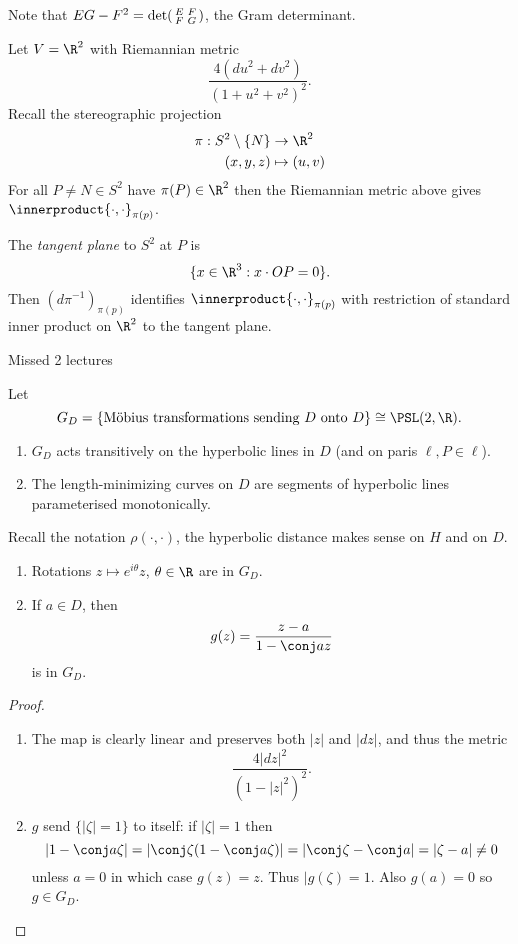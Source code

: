 \documentclass[a4paper]{article}
\theoremstyle{definition}
\newcommand*{\inner}{\innerproduct}
\begin{document}
Note that \(EG - F^2 = \det \begin{psmallmatrix} E & F \\ F & G \end{psmallmatrix}\), the Gram determinant.

\begin{eg}
  Let \(V = \R^2\) with Riemannian metric
  \[
    \frac{4 (du^2 + dv^2)}{(1 + u^2 + v^2)^2}.
  \]
  Recall the stereographic projection
  \begin{align*}
    \pi: S^2 \setminus \{N\} &\to \R^2 \\
    (x, y, z) &\mapsto (u, v)
  \end{align*}
  For all \(P \neq N \in S^2\) have \(\pi(P) \in \R^2\) then the Riemannian metric above gives \(\inner{\cdot, \cdot}_{\pi(p)}\).

  The \emph{tangent plane} to \(S^2\) at \(P\) is
  \[
    \{x \in \R^3: x \cdot OP = 0\}.
  \]
  Then \((d\pi^{-1})_{\pi(p)}\) identifies \(\inner{\cdot, \cdot}_{\pi(p)}\) with restriction of standard inner product on \(\R^2\) to the tangent plane.
\end{eg}

Missed 2 lectures

Let
\[
  G_D = \{\text{Möbius transformations sending \(D\) onto \(D\)}\} \cong \PSL(2, \R).
\]

\begin{enumerate}
\item \(G_D\) acts transitively on the hyperbolic lines in \(D\) (and on paris \(\ell, P \in \ell\)).
\item The length-minimizing curves on \(D\) are segments of hyperbolic lines parameterised monotonically.
\end{enumerate}

Recall the notation \(\rho(\cdot, \cdot)\), the hyperbolic distance makes sense on \(H\) and on \(D\).

\begin{lemma}\leavevmode
  \begin{enumerate}
  \item Rotations \(z \mapsto e^{i\theta}z\), \(\theta \in \R\) are in \(G_D\).
  \item If \(a \in D\), then
    \[
      g(z) = \frac{z - a}{1 - \conj a z}
    \]
    is in \(G_D\).
  \end{enumerate}
\end{lemma}

\begin{proof}\leavevmode
  \begin{enumerate}
  \item The map is clearly linear and preserves both \(|z|\) and \(|dz|\), and thus the metric
    \[
      \frac{4|dz|^2}{(1 - |z|^2)^2}.
    \]
  \item \(g\) send \(\{|\zeta| = 1\}\) to itself: if \(|\zeta| = 1\) then
    \[
      |1 - \conj a \zeta| = |\conj \zeta (1 - \conj a \zeta)| = |\conj \zeta - \conj a| = |\zeta - a| \neq 0
    \]
    unless \(a = 0\) in which case \(g(z) = z\). Thus \(|g(\zeta) = 1\). Also \(g(a) = 0\) so \(g \in G_D\).
  \end{enumerate}
\end{proof}
\end{document}
